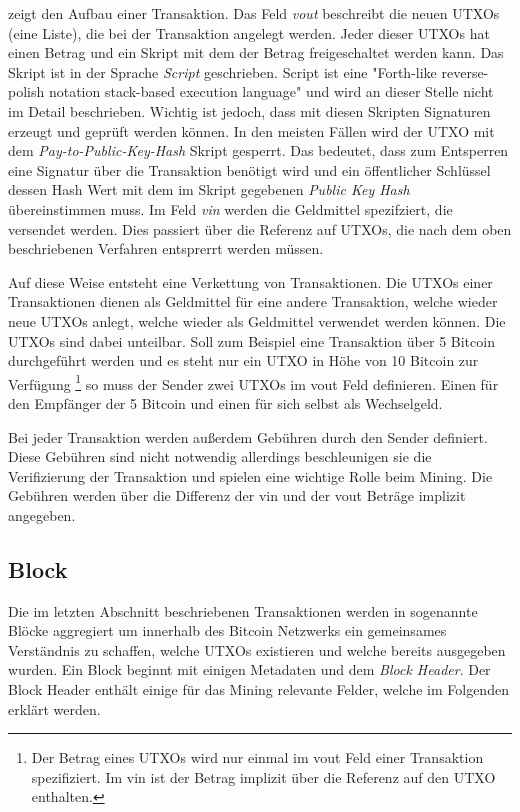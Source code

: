 \documentclass[ngerman,runningheads,a4paper]{llncs}[2018/03/10]
\begin{document}
 zeigt den Aufbau einer Transaktion. Das Feld \textit{vout} beschreibt die neuen UTXOs (eine Liste), die bei der Transaktion angelegt werden. Jeder dieser UTXOs hat einen Betrag und ein Skript mit dem der Betrag freigeschaltet werden kann. Das Skript ist in der Sprache \textit{Script} geschrieben. Script ist eine "Forth-like reverse-polish notation stack-based execution language" \citep{bitcoinbook} und wird an dieser Stelle nicht im Detail beschrieben. Wichtig ist jedoch, dass mit diesen Skripten Signaturen erzeugt und geprüft werden können. In den meisten Fällen wird der UTXO mit dem \textit{Pay-to-Public-Key-Hash} \citep{bitcoinbook} Skript gesperrt. Das bedeutet, dass zum Entsperren eine Signatur über die Transaktion benötigt wird und ein öffentlicher Schlüssel dessen Hash Wert mit dem im Skript gegebenen \textit{Public Key Hash} übereinstimmen muss. Im Feld \textit{vin} werden die Geldmittel spezifziert, die versendet werden. Dies passiert über die Referenz auf UTXOs, die nach dem oben beschriebenen Verfahren entsprerrt werden müssen.

Auf diese Weise entsteht eine Verkettung von Transaktionen. Die UTXOs einer Transaktionen dienen als Geldmittel für eine andere Transaktion, welche wieder neue UTXOs anlegt, welche wieder als Geldmittel verwendet werden können. Die UTXOs sind dabei unteilbar. Soll zum Beispiel eine Transaktion über 5 Bitcoin durchgeführt werden und es steht nur ein UTXO in Höhe von 10 Bitcoin zur Verfügung \footnote{Der Betrag eines UTXOs wird nur einmal im vout Feld einer Transaktion spezifiziert. Im vin ist der Betrag implizit über die Referenz auf den UTXO enthalten.} so muss der Sender zwei UTXOs im vout Feld definieren. Einen für den Empfänger der 5 Bitcoin und einen für sich selbst als Wechselgeld.

Bei jeder Transaktion werden außerdem Gebühren durch den Sender definiert. Diese Gebühren sind nicht notwendig allerdings beschleunigen sie die Verifizierung der Transaktion und spielen eine wichtige Rolle beim Mining. Die Gebühren werden über die Differenz der vin und der vout Beträge implizit angegeben.

\subsection{Block}\label{sec:block}

Die im letzten Abschnitt beschriebenen Transaktionen werden in sogenannte Blöcke aggregiert um innerhalb des Bitcoin Netzwerks ein gemeinsames Verständnis zu schaffen, welche UTXOs existieren und welche bereits ausgegeben wurden. Ein Block beginnt mit einigen Metadaten und dem \textit{Block Header}. Der Block Header enthält einige für das Mining relevante Felder, welche im Folgenden erklärt werden.
\end{document}
